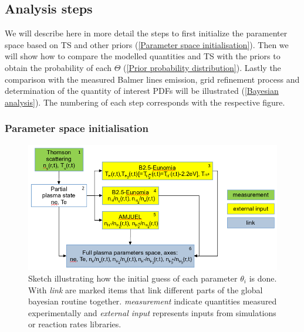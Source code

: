 \subsection{Analysis steps}\label{Analysis steps}

We will describe here in more detail the steps to first initialize the paramenter space based on TS and other priors (\autoref{Parameter space initialisation}). Then we will show how to compare the modelled quantities and TS with the priors to  obtain the probability of each $\Theta$ (\autoref{Prior probability distribution}). Lastly the comparison with the measured Balmer lines emission, grid refinement process and determination of the quantity of interest PDFs will be illustrated (\autoref{Bayesian analysis}). The numbering of each step corresponds with the respective figure.

\subsubsection{Parameter space initialisation}\label{Parameter space initialisation}

\begin{figure}[!ht]
	\centering
	\includegraphics[scale=0.29,trim={0 0 0 0},clip]{Chapters/chapter3/figs/bayesian_steps10.png}
	\caption{Sketch illustrating how the initial guess of each parameter $\theta_i$ is done. With \emph{link} are marked items that link different parts of the global bayesian routine together. \emph{measurement} indicate quantities measured experimentally and \emph{external input} represents inputs from simulations or reaction rates libraries.}
	\label{fig:bayes1a}
\end{figure}


